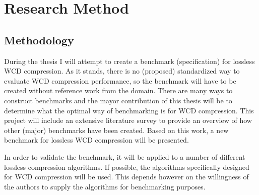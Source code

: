 \chapter{Research Method}

\section{Methodology}
During the thesis I will attempt to create a benchmark (specification) for lossless WCD compression. As it stands, there is no (proposed) standardized way to evaluate WCD compression performance, so the benchmark will have to be created without reference work from the domain. There are many ways to construct benchmarks and the mayor contribution of this thesis will be to determine what the optimal way of benchmarking is for WCD compression. 
This project will include an extensive literature survey to provide an overview of how other (major) benchmarks have been created. Based on this work, a new benchmark for lossless WCD compression will be presented.

In order to validate the benchmark, it will be applied to a number of different lossless compression algorithms. If possible, the algorithms specifically designed for WCD compression\cite{amblasreal}\cite{beaudoin2010application}\cite{moszynski2013novel} will be used. This depends however on the willingness of the authors to supply the algorithms for benchmarking purposes. 


